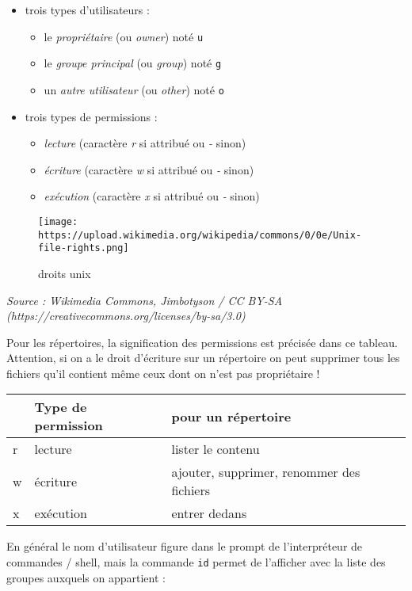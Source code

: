 \documentclass[
  11pt,
]{article}
\providecommand{\tightlist}{%
  \setlength{\itemsep}{0pt}\setlength{\parskip}{0pt}}
\newcounter{prop}
\begin{document}
\begin{itemize}
\item
  trois types d'utilisateurs :

  \begin{itemize}
  \tightlist
  \item
    le \emph{propriétaire} (ou \emph{owner}) noté \texttt{u}
  \item
    le \emph{groupe principal} (ou \emph{group}) noté \texttt{g}
  \item
    un \emph{autre utilisateur} (ou \emph{other}) noté \texttt{o}
  \end{itemize}
\item
  trois types de permissions :

  \begin{itemize}
  \tightlist
  \item
    \emph{lecture} (caractère \emph{r} si attribué ou \emph{-} sinon)
  \item
    \emph{écriture} (caractère \emph{w} si attribué ou \emph{-} sinon)
  \item
    \emph{exécution} (caractère \emph{x} si attribué ou \emph{-} sinon)
  \end{itemize}
\end{itemize}

\begin{figure}
\centering
\texttt{[image: https://upload.wikimedia.org/wikipedia/commons/0/0e/Unix-file-rights.png]}
\caption{droits unix}
\end{figure}

\emph{Source : Wikimedia Commons, Jimbotyson / CC BY-SA
(https://creativecommons.org/licenses/by-sa/3.0)}

Pour les répertoires, la signification des permissions est précisée dans
ce tableau. Attention, si on a le droit d'écriture sur un répertoire on
peut supprimer tous les fichiers qu'il contient même ceux dont on n'est
pas propriétaire !

\begin{longtable}[]{@{}lll@{}}
\toprule
& Type de permission & pour un répertoire\tabularnewline
\midrule
\endhead
r & lecture & lister le contenu\tabularnewline
w & écriture & ajouter, supprimer, renommer des fichiers\tabularnewline
x & exécution & entrer dedans\tabularnewline
\bottomrule
\end{longtable}

En général le nom d'utilisateur figure dans le prompt de l'interpréteur
de commandes / shell, mais la commande \texttt{id} permet de l'afficher
avec la liste des groupes auxquels on appartient :
\end{document}
